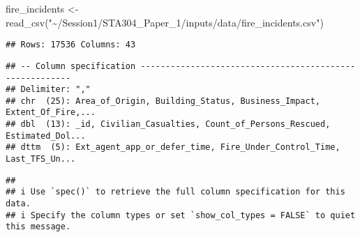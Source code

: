 \documentclass[
]{article}
\newenvironment{Shaded}{\begin{snugshade}}{\end{snugshade}}
\newcommand{\FunctionTok}[1]{\textcolor[rgb]{0.00,0.00,0.00}{#1}}
\newcommand{\NormalTok}[1]{#1}
\newcommand{\OtherTok}[1]{\textcolor[rgb]{0.56,0.35,0.01}{#1}}
\newcommand{\StringTok}[1]{\textcolor[rgb]{0.31,0.60,0.02}{#1}}
\begin{document}
\begin{Shaded}
\begin{Highlighting}[]
\NormalTok{fire\_incidents }\OtherTok{\textless{}{-}}
  \FunctionTok{read\_csv}\NormalTok{(}\StringTok{"\textasciitilde{}/Session1/STA304\_Paper\_1/inputs/data/fire\_incidents.csv"}\NormalTok{)}
\end{Highlighting}
\end{Shaded}

\begin{verbatim}
## Rows: 17536 Columns: 43
\end{verbatim}

\begin{verbatim}
## -- Column specification --------------------------------------------------------
## Delimiter: ","
## chr  (25): Area_of_Origin, Building_Status, Business_Impact, Extent_Of_Fire,...
## dbl  (13): _id, Civilian_Casualties, Count_of_Persons_Rescued, Estimated_Dol...
## dttm  (5): Ext_agent_app_or_defer_time, Fire_Under_Control_Time, Last_TFS_Un...
\end{verbatim}

\begin{verbatim}
## 
## i Use `spec()` to retrieve the full column specification for this data.
## i Specify the column types or set `show_col_types = FALSE` to quiet this message.
\end{verbatim}
\end{document}
